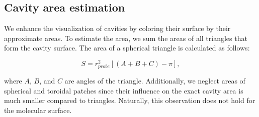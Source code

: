 \subsection{Cavity area estimation}
We enhance the visualization of cavities by coloring their surface by their approximate areas.
To estimate the area, we sum the areas of all triangles that form the cavity surface.
The area of a spherical triangle is calculated as follows:

\begin{equation}
  S = r_{probe}^2 \left[ \left( A + B + C \right) - \pi \right],
\end{equation}

where $A$, $B$, and $C$ are angles of the triangle. 
Additionally, we neglect areas of spherical and toroidal patches since their influence on the exact cavity area is much smaller compared to triangles.
Naturally, this observation does not hold for the molecular surface.
